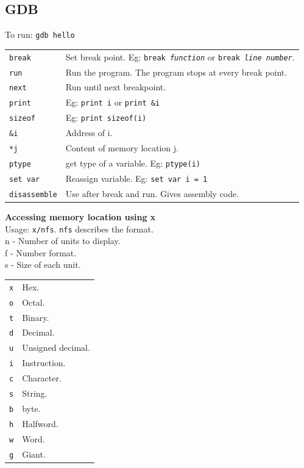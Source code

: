 \subsection{GDB}
To run: \texttt{gdb hello}\\
\begin{tabularx}{\linewidth}{lX}
\texttt{break} & Set break point. Eg: \texttt{break \textit{function}} or \texttt{break \textit{line number}}.\\
\texttt{run} & Run the program. The program stops at every break point.\\
\texttt{next} & Run until next breakpoint.\\
\texttt{print} & Eg: \texttt{print i} or \texttt{print \&i}\\
\texttt{sizeof} & Eg: \texttt{print sizeof(i)}\\
\texttt{\&i} & Address of i.\\
\texttt{*j} & Content of memory location j.\\
\texttt{ptype} & get type of a variable. Eg: \texttt{ptype(i)}\\
\texttt{set var} & Reassign variable. Eg: \texttt{set var i = 1}\\
\texttt{disassemble} & Use after break and run. Gives assembly code.\\
\end{tabularx}

\textbf{Accessing memory location using x}\\
Usage: \texttt{x/nfs}. \texttt{nfs} describes the format.\\
n - Number of units to display.\\
f - Number format.\\
s - Size of each unit.\\
\begin{tabularx}{\linewidth}{lX}
\hline
\texttt{x} & Hex.\\
\texttt{o} & Octal.\\
\texttt{t} & Binary.\\
\texttt{d} & Decimal.\\
\texttt{u} & Unsigned decimal.\\
\texttt{i} & Instruction.\\
\texttt{c} & Character.\\
\texttt{s} & String.\\
\hline
\texttt{b} & byte.\\
\texttt{h} & Halfword.\\
\texttt{w} & Word.\\
\texttt{g} & Giant.\\
\hline
\end{tabularx}

